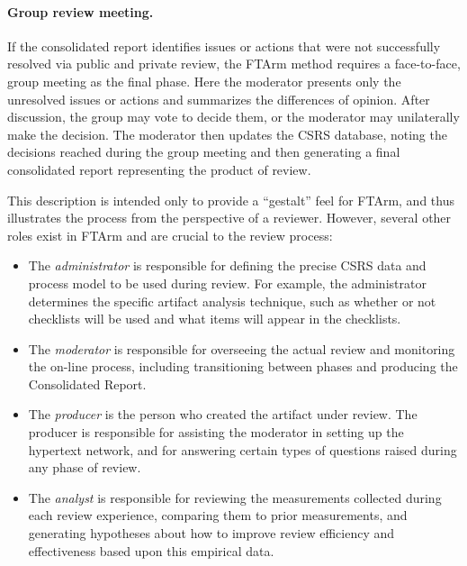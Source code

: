 \paragraph {Group review meeting.} If the consolidated report 
identifies issues or actions that were not successfully resolved via
public and private review, the FTArm method requires a face-to-face,
group meeting as the final phase.  Here the moderator presents only
the unresolved issues or actions and summarizes the differences of
opinion.  After discussion, the group may vote to decide them, or the
moderator may unilaterally make the decision. The moderator then
updates the CSRS database, noting the decisions reached during the
group meeting and then generating a final consolidated report
representing the product of review.

This description is intended only to provide a ``gestalt'' feel for FTArm,
and thus illustrates the process from the perspective of a reviewer.
However, several other roles exist in FTArm and are crucial to the review
process:

\begin{itemize}
  
\item The {\em administrator} is responsible for defining the precise CSRS
  data and process model to be used during review.  For example, the
  administrator determines the specific artifact analysis technique, such as
  whether or not checklists will be used and what items will appear in the
  checklists. 
  
\item The {\em moderator} is responsible for overseeing the actual review
  and monitoring the on-line process, including transitioning between phases
  and producing the Consolidated Report.
  
\item The {\em producer} is the person who created the artifact under
  review.  The producer is responsible for assisting the moderator in
  setting up the hypertext network, and for answering certain types of
  questions raised during any phase of review.
  
\item The {\em analyst} is responsible for reviewing the measurements
  collected during each review experience, comparing them to prior
  measurements, and generating hypotheses about how to improve review
  efficiency and effectiveness based upon this empirical data.

\end{itemize}


